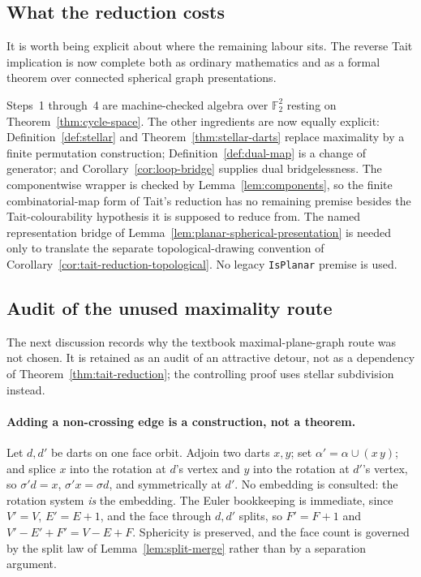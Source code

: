 \subsection{What the reduction costs}

It is worth being explicit about where the remaining labour sits.  The
reverse Tait implication is now complete both as ordinary mathematics and as
a formal theorem over connected spherical graph presentations.

Steps~1 through~4 are machine-checked algebra over $\mathbb{F}_2^2$ resting
on Theorem~\ref{thm:cycle-space}.  The other ingredients are now
equally explicit: Definition~\ref{def:stellar} and
Theorem~\ref{thm:stellar-darts} replace maximality by a finite permutation
construction; Definition~\ref{def:dual-map} is a change of generator; and
Corollary~\ref{cor:loop-bridge} supplies dual bridgelessness.  The
componentwise wrapper is checked by Lemma~\ref{lem:components}, so the finite
combinatorial-map form of Tait's reduction has no remaining premise besides
the Tait-colourability hypothesis it is supposed to reduce from.  The named
representation bridge of Lemma~\ref{lem:planar-spherical-presentation} is
needed only to translate the separate topological-drawing convention of
Corollary~\ref{cor:tait-reduction-topological}.  No legacy
\texttt{IsPlanar} premise is used.

\subsection{Audit of the unused maximality route}

The next discussion records why the textbook maximal-plane-graph route was
not chosen.  It is retained as an audit of an attractive detour, not as a
dependency of Theorem~\ref{thm:tait-reduction}; the controlling proof uses
stellar subdivision instead.

\paragraph{Adding a non-crossing edge is a construction, not a theorem.}
Let $d, d'$ be darts on one face orbit. Adjoin two darts $x, y$; set
$\alpha' = \alpha \cup (x\,y)$; and splice $x$ into the rotation at $d$'s
vertex and $y$ into the rotation at $d'$'s vertex, so $\sigma' d = x$,
$\sigma' x = \sigma d$, and symmetrically at $d'$. No embedding is consulted:
the rotation system \emph{is} the embedding. The Euler bookkeeping is
immediate, since $V' = V$, $E' = E + 1$, and the face through $d, d'$ splits,
so $F' = F + 1$ and $V' - E' + F' = V - E + F$. Sphericity is preserved, and
the face count is governed by the split law of
Lemma~\ref{lem:split-merge} rather than by a separation argument.

